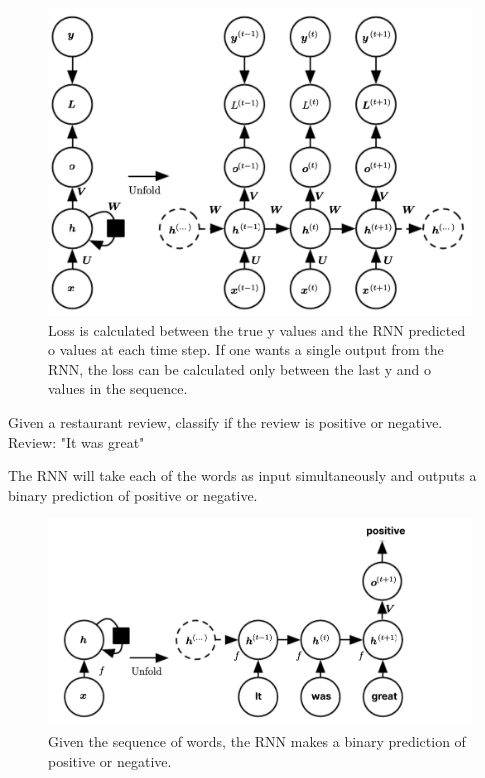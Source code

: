 

\begin{figure}[H]
    \centering
    \includegraphics[scale=0.25]{images/Chapter12/RNN_with_loss.png}
    \caption{Loss is calculated between the true y values and the RNN predicted o values at each time step. If one wants a single output from the RNN, the loss can be calculated only between the last y and o values in the sequence.} 
    \label{fig:12.2}
\end{figure}

\begin{example}
    Given a restaurant review, classify if the review is positive or negative.\\
    Review: "It was great"
\end{example}

The RNN will take each of the words as input simultaneously and outputs a binary prediction of positive or negative. 





\begin{figure}[H]
    \centering
    \includegraphics[scale=0.25]{images/Chapter12/sentiment_analysis.png}
    \caption{Given the sequence of words, the RNN makes a binary prediction of positive or negative.}
    \label{fig:12.2}
\end{figure}


